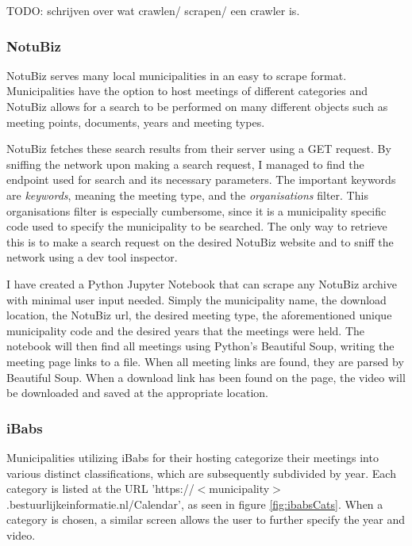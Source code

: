 \documentclass[twoside]{uva-inf-bachelor-thesis}
\begin{document}
TODO: schrijven over wat crawlen/ scrapen/ een crawler is.

\subsubsection{NotuBiz}
NotuBiz serves many local municipalities in an easy to scrape format. Municipalities have the option to host meetings of different categories and NotuBiz allows for a search to be performed on many different objects such as meeting points, documents, years and meeting types. 

NotuBiz fetches these search results from their server using a GET request. By sniffing the network upon making a search request, I managed to find the endpoint used for search and its necessary parameters. The important keywords are \textit{keywords}, meaning the meeting type, and the \textit{organisations} filter. This organisations filter is especially cumbersome, since it is a municipality specific code used to specify the municipality to be searched. The only way to retrieve this is to make a search request on the desired NotuBiz website and to sniff the network using a dev tool inspector. 

I have created a Python Jupyter Notebook that can scrape any NotuBiz archive with minimal user input needed. Simply the municipality name, the download location, the NotuBiz url, the desired meeting type, the aforementioned unique municipality code and the desired years that the meetings were held. 
The notebook will then find all meetings using Python's Beautiful Soup, writing the meeting page links to a file. When all meeting links are found, they are parsed by Beautiful Soup. When a download link has been found on the page, the video will be downloaded and saved at the appropriate location.

\subsubsection{iBabs}
Municipalities utilizing iBabs for their hosting categorize their meetings into various distinct classifications, which are subsequently subdivided by year.
Each category is listed at the URL 'https://$<$municipality$>$.bestuurlijkeinformatie.nl/Calendar', as seen in figure \ref{fig:ibabsCats}. When a category is chosen, a similar screen allows the user to further specify the year and video.
\end{document}
